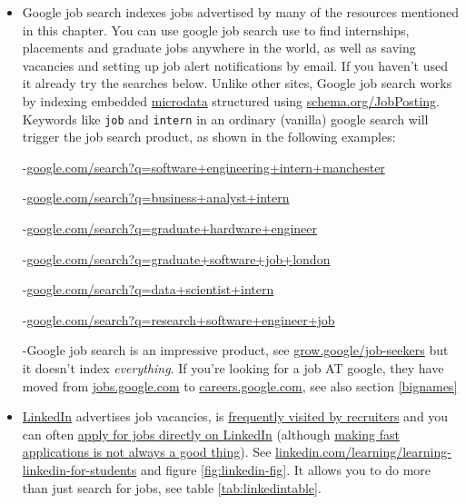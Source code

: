 \documentclass[
]{book}
\begin{document}
\begin{itemize}
\item
  Google job search indexes jobs advertised by many of the resources mentioned in this chapter. You can use google job search use to find internships, placements and graduate jobs anywhere in the world, as well as saving vacancies and setting up job alert notifications by email. If you haven't used it already try the searches below. Unlike other sites, Google job search works by indexing embedded \href{https://en.wikipedia.org/wiki/Microdata_(HTML)}{microdata} structured using \href{https://schema.org/JobPosting}{schema.org/JobPosting}. Keywords like \texttt{job} and \texttt{intern} in an ordinary (vanilla) google search will trigger the job search product, as shown in the following examples:

  -\href{https://www.google.com/search?q=software+engineering+intern+manchester}{google.com/search?q=software+engineering+intern+manchester}

  -\href{https://www.google.com/search?q=business+analyst+intern}{google.com/search?q=business+analyst+intern}

  -\href{https://www.google.com/search?q=graduate+hardware+engineer}{google.com/search?q=graduate+hardware+engineer}

  -\href{https://www.google.com/search?q=graduate+software+job+london}{google.com/search?q=graduate+software+job+london}

  -\href{https://www.google.com/search?q=data+scientist+intern}{google.com/search?q=data+scientist+intern}

  -\href{https://www.google.com/search?q=research+software+engineer+job}{google.com/search?q=research+software+engineer+job}

  -Google job search is an impressive product, see \href{https://grow.google/job-seekers}{grow.google/job-seekers} but it doesn't index \emph{everything}. If you're looking for a job AT google, they have moved from \href{https://jobs.google.com/about/}{jobs.google.com} to \href{https://careers.google.com/}{careers.google.com}, see also section \ref{bignames}
\item
  \href{http://www.linkedin.com}{LinkedIn} advertises job vacancies, is \href{https://blog.linkedin.com/2016/10/06/now-you-can-privately-signal-to-recruiters-youre-open-to-new-job}{frequently visited by recruiters} and you can often \href{https://www.linkedin.com/help/linkedin/answer/75815/applying-for-jobs-on-linkedin?lang=en}{apply for jobs directly on LinkedIn} (although \href{https://medium.com/otta-blog/job-boards-making-fast-applications-is-not-a-good-thing-5a4970887ecd}{making fast applications is not always a good thing}). See \href{https://www.linkedin.com/learning/learning-linkedin-for-students}{linkedin.com/learning/learning-linkedin-for-students} and figure \ref{fig:linkedin-fig}. It allows you to do more than just search for jobs, see table \ref{tab:linkedintable}.
\end{itemize}
\end{document}
